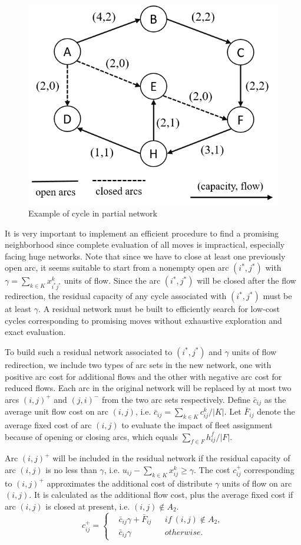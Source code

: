\documentclass[11pt,nonblindrev,fleqn]{article}
\begin{document}
\begin{figure}[H]
\setlength{\abovecaptionskip}{-5pt}
\setlength{\belowcaptionskip}{-5pt}
\centering
\includegraphics[width=0.5\linewidth]{F2.png}
\caption{Example of cycle in partial network}
\label{cycle}
\end{figure}

It is very important to implement an efficient procedure to find a promising neighborhood since complete evaluation of all moves is impractical, especially facing huge networks. Note that since we have to close at least one previously open arc, it seems suitable to start from a nonempty open arc $(i^*,j^*)$ with $\gamma = \sum_{k\in K} x_{i^*j^*}^k$ units of flow. Since the arc $(i^*,j^*)$ will be closed after the flow redirection, the residual capacity of any cycle associated with $(i^*,j^*)$ must be at least $\gamma$. A residual network must be built to efficiently search for low-cost cycles corresponding to promising moves without exhaustive exploration and exact evaluation.

To build such a residual network associated to $(i^*,j^*)$ and $\gamma$ units of flow redirection, we include two types of arc sets in the new network, one with positive arc cost for additional flows and the other with negative arc cost for reduced flows. Each arc in the original network will be replaced by at most two arcs $(i,j)^+$ and $(j,i)^-$ from the two arc sets respectively. Define $\bar{c}_{ij}$ as the average unit flow cost on arc $(i,j)$, i.e. $\bar{c}_{ij} = \sum_{k\in K} c_{ij}^k / |K|$. Let $\bar{F}_{ij}$ denote the average fixed cost of arc $(i,j)$ to evaluate the impact of fleet assignment because of opening or closing arcs, which equals $\sum_{f\in F}h_{ij}^f/ |F|$.

Arc $(i,j)^+$ will be included in the residual network if the residual capacity of arc $(i,j)$ is no less than $\gamma$, i.e. $ u_{ij} - \sum_{k\in K} x_{ij}^k \geq \gamma$. The cost $c_{ij}^+$ corresponding to $(i,j)^+$ approximates the additional cost of distribute $\gamma$ units of flow on arc $(i,j)$. It is calculated as the additional flow cost, plus the average fixed cost if arc $(i,j)$ is closed at present, i.e. $(i,j) \notin A_2$.
\begin{equation*}
c_{ij}^+ = \left\{
\begin{aligned}
&\bar{c}_{ij} \gamma + \bar{F}_{ij}  & & if\ (i,j) \notin A_2, \\
&\bar{c}_{ij} \gamma                 & & otherwise.
\end{aligned}
\right.
\end{equation*}
\end{document}
